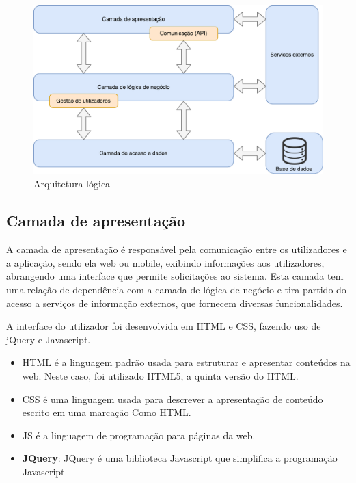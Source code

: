 \begin{figure}[!htb]
	\centering
	\includegraphics[scale = 0.6]{esquemas/arquitetura-logica.pdf}
	\caption{Arquitetura lógica}
	\label{opencvlogo}
\end{figure}



\subsection{Camada de apresentação}


A camada de apresentação é responsável pela comunicação entre os utilizadores e a aplicação, sendo ela web ou mobile, exibindo informações aos utilizadores, abrangendo uma interface que permite solicitações ao sistema. Esta camada tem uma relação de dependência com a camada de lógica de negócio e tira partido do acesso a serviços de informação externos, que fornecem diversas funcionalidades. 


A interface do utilizador foi desenvolvida em  \ac{HTML} e \acs{CSS}, fazendo uso de jQuery e Javascript.



\begin{itemize}
	\item \ac{HTML} é a linguagem padrão usada para estruturar e apresentar conteúdos na web. Neste caso, foi utilizado HTML5, a quinta versão do \ac{HTML}.
	\item \ac{CSS} é uma linguagem usada para descrever a apresentação de conteúdo escrito em uma marcação Como HTML.
	
	\item \ac{JS} é a linguagem de programação para páginas da web.
	\item \textbf{JQuery}: JQuery é uma biblioteca Javascript que simplifica a programação Javascript
\end{itemize}









